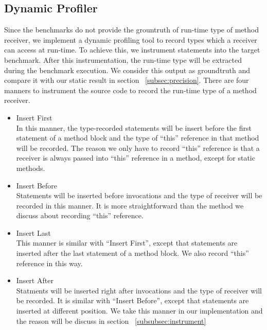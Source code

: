 \documentclass{fac}
\begin{document}
\subsection{Dynamic Profiler}\label{subsec:dynamic-profiler}
Since the benchmarks do not provide the grountruth of run-time type of method receiver, we implement a dynamic profiling tool to record  types which a receiver can access at run-time. To achieve this, we instrument statements into the target benchmark. After this instrumentation, the run-time type will be extracted during the benchmark execution. We consider this output as groundtruth and compare it with our static result in section ~\ref{subsec:precision}. There are four manners to instrument the source code to record the run-time type of a method receiver.
\begin{itemize}
\item Insert First\\
In this manner, the type-recorded statements will be insert before the first statement of a method block and the type of ``this'' reference in that method will be recorded. The reason we only have to record ``this'' reference is that a receiver is always passed into ``this'' reference in a method, except for static methods. 
\item Insert Before\\
Statements will be inserted before invocations and the type of receiver will be recorded in this manner. It is more straightforward than the method we discuss about recording ``this'' reference.
\item Insert Last\\
This manner is similar with ``Insert First'', except that statements are inserted after the last statement of a method block. We also record ``this'' reference in this way.
\item Insert After\\
Statments will be inserted right after invocations and the type of receiver will be recorded. It is similar with ``Insert Before'', except that statements are inserted at different position. We take this manner in our implementation and the reason will be discuss in section ~\ref{subsubsec:instrument}
\end{itemize}
\end{document}
